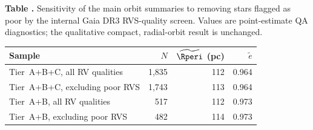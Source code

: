 \begin{center}
\label{tab:rv_quality_sensitivity}
\begin{minipage}{\columnwidth}
\small\textbf{Table \thetable.} Sensitivity of the main orbit summaries to
removing stars flagged as poor by the internal Gaia DR3 RVS-quality screen.
Values are point-estimate QA diagnostics; the qualitative compact,
radial-orbit result is unchanged.
\end{minipage}
\vspace{0.4ex}

\footnotesize
\setlength{\tabcolsep}{3pt}
\begin{tabular}{@{}lrrr@{}}
\hline\hline
Sample & $N$ & $\widetilde{\Rperi}$ (pc) & $\tilde e$ \\
\hline
Tier~A+B+C, all RV qualities        & 1{,}835 & 112 & 0.964 \\
Tier~A+B+C, excluding poor RVS      & 1{,}743 & 113 & 0.964 \\
Tier~A+B, all RV qualities          & 517 & 112 & 0.973 \\
Tier~A+B, excluding poor RVS        & 482 & 114 & 0.973 \\
\hline
\end{tabular}
\end{center}
